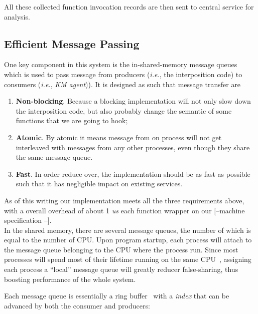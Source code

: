 \documentclass[letterpaper,twocolumn,10pt]{article}
\begin{document}
All these collected function invocation records are then sent to central
service for analysis. 

\subsection{Efficient Message Passing} \label{sec:effimq}
One key component in this system is the in-shared-memory message queues which
is used to pass message from producers (\textit{i.e.}, the interposition
code) to consumers (\textit{i.e.}, \textit{KM agent})). It is designed as
such that message transfer are 
\begin{enumerate}
    \item \textbf{Non-blocking}. Because a blocking
        implementation will not only slow down the interposition code, but
        also probably change the semantic of some functions that we are going
        to hook;
    \item \textbf{Atomic}. By atomic it means message from on
        process will not get interleaved with messages from any other
        processes, even though they share the same message queue.
    \item \textbf{Fast}. In order reduce over, the implementation should be as
        fast as possible such that it has negligible impact on existing services.
\end{enumerate}
As of this writing our implementation meets all the three requirements above,
with a overall overhead of about 1 \textit{us} each function wrapper on our
[--machine specification --].\\ 


In the shared memory, there are several message queues, the number of which
is equal to the number of CPU. Upon program startup, each process will attach
to the message queue belonging to the CPU where the process run. Since most
processes will spend most of their lifetime running on the same
CPU~\cite{somebodyhere}, assigning each process a ``local'' message queue
will greatly reducer false-sharing, thus boosting performance of the whole
system. 

Each message queue is essentially a ring buffer~\cite{ringbuffer} with a
\textit{index} that can be advanced by both the consumer and producers: 
\end{document}
